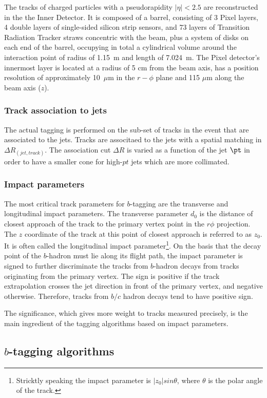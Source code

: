 The tracks of charged particles with a pseudorapidity $|\eta| < 2.5$ are reconstructed in the the Inner Detector. It is composed of a barrel, consisting of 3 Pixel layers, 4 double layers of single-sided silicon strip sensors, and 73 layers of Transition Radiation Tracker straws concentric with the beam, plus a system of disks on each end of the barrel, occupying in total a cylindrical volume around the interaction point of radius of 1.15~m and length of 7.024~m. The Pixel detector's innermost layer is located at a radius of 5 cm from the beam axis, has a position resolution of approximately 10~$\mu$m in the $r-\phi$ plane and 115 $\mu$m along the beam axis ($z$). %


\subsubsection{Track association to jets}

The actual tagging is performed on the sub-set of tracks in the event that are associated to the jets. Tracks are associtaed to the jets with a spatial matching in $\Delta R_{(jet,track)}$. The association cut $\Delta R$ is varied as a function of the jet $\pt$ in order to have a smaller cone for high-$pt$ jets which are more collimated.




\subsubsection{Impact parameters}
The most critical track parameters for $b$-tagging are the transverse and longitudinal impact parameters. The transverse parameter $d_0$ is the distance of closest approach of the track to the primary vertex point in the $r\phi$ projection. The $z$ coordinate of the track at this point of closest approach is referred to as $z_0$. It is often called the longitudinal impact parameter\footnote{Stricktly speaking the impact parameter is $|z_0|sin\theta$, where $\theta$ is the polar angle of the track.}. On the basis that the decay point of the $b$-hadron must lie along its flight path, the impact parameter is signed to further discriminate the tracks from $b$-hadron decays from tracks originating from the primary vertex. The sign is positive if the track extrapolation crosses the jet direction in front of the primary vertex, and negative otherwise. Therefore, tracks from $b/c$ hadron decays tend to have positive sign.

The significance, which gives more weight to tracks measured precisely, is the main ingredient of the tagging algorithms based on impact parameters.

\subsection{$b$-tagging algorithms}

